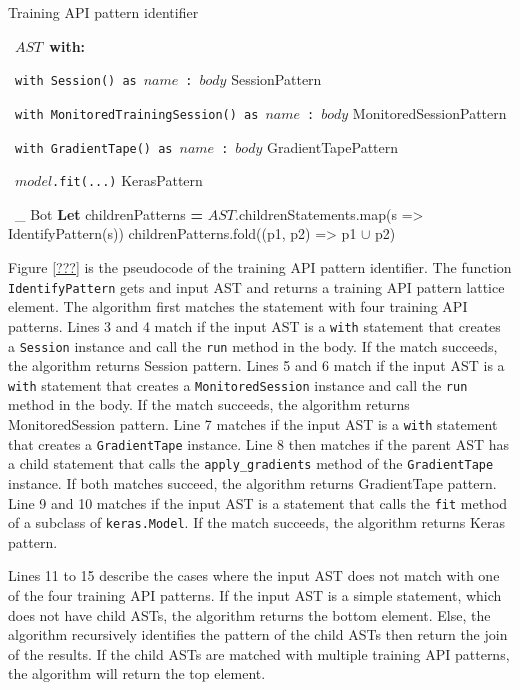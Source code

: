 \begin{algorithm}
\caption{Training API pattern identifier}\label{tapa}
  \begin{algorithmic}[1]
    \Match~$AST$~\textbf{with:}

      \Case~{\tt with Session() as}~$name$~{\tt :}~$body$
          SessionPattern
        \EndIf
      \EndCase

      \Case~{\tt with MonitoredTrainingSession() as}~$name$~{\tt :}~$body$
          MonitoredSessionPattern
        \EndIf
      \EndCase

      \Case~{\tt with GradientTape() as}~$name$~{\tt :}~$body$
          GradientTapePattern
        \EndIf
      \EndCase

      \Case~$model${\tt.fit(...)}
          KerasPattern
        \EndIf
      \EndCase

      \Case~\_
          Bot 
        \Else
          \State \textbf{Let} childrenPatterns \textbf{=} $AST$.childrenStatements.map(s => IdentifyPattern(s))
          \State childrenPatterns.fold((p1, p2) => p1 $\cup$ p2) 
        \EndIf
      \EndCase

    \EndMatch
    \EndFunction
  \end{algorithmic}
\end{algorithm}

Figure \ref{???} is the pseudocode of the training API pattern identifier.
The function {\tt IdentifyPattern} gets and input AST and returns a training
API pattern lattice element.
The algorithm first matches the statement with four training API patterns.
Lines 3 and 4 match if the input AST is a {\tt with} statement that
creates a {\tt Session} instance and call the {\tt run} method in the body.
If the match succeeds, the algorithm returns Session pattern.
Lines 5 and 6 match if the input AST is a {\tt with} statement that
creates a {\tt MonitoredSession} instance and call the {\tt run} method in the
body.
If the match succeeds, the algorithm returns MonitoredSession pattern.
Line 7 matches if the input AST is a {\tt with} statement that
creates a {\tt GradientTape} instance.
Line 8 then matches if the parent AST has a child statement that calls the
{\tt apply\_gradients} method of the {\tt GradientTape} instance.
If both matches succeed, the algorithm returns GradientTape pattern.
Line 9 and 10 matches if the input AST is a statement that calls
the {\tt fit} method of a subclass of {\tt keras.Model}. 
If the match succeeds, the algorithm returns Keras pattern.

Lines 11 to 15 describe the cases where the input AST does not match with 
one of the four training API patterns.
If the input AST is a simple statement, which does not have child ASTs,
the algorithm returns the bottom element.
Else, the algorithm recursively identifies the pattern of the child ASTs
then return the join of the results.
If the child ASTs are matched with multiple training API patterns, 
the algorithm will return the top element.

\pagebreak
